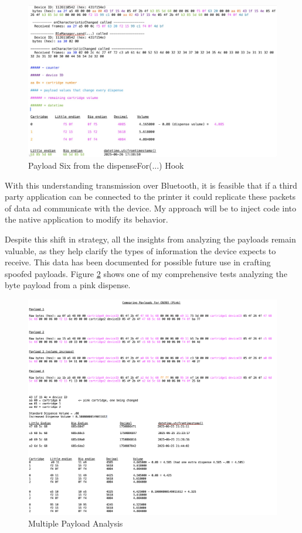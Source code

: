 \begin{figure}[H]
	\centering
	\includegraphics[width=0.7\linewidth]{payload6}
	\caption{Payload Six from the dispenseFor(...) Hook}
	\label{fig:payload6}
\end{figure}

With this understanding transmission over Bluetooth, it is feasible that if a third party application can be connected to the printer it could replicate these packets of data ad communicate with the device. My approach will be to inject code into the native application to modify its behavior.

Despite this shift in strategy, all the insights from analyzing the payloads remain valuable, as they help clarify the types of information the device expects to receive. This data has been documented for possible future use in crafting spoofed payloads. Figure \ref{fig:bigpayload} shows one of my comprehensive tests analyzing the byte payload from a pink dispense.
\begin{figure}[H]
	\centering
	\includegraphics[scale=.3]{bigpayload}
	\caption{Multiple Payload Analysis}
	\label{fig:bigpayload}
\end{figure}


